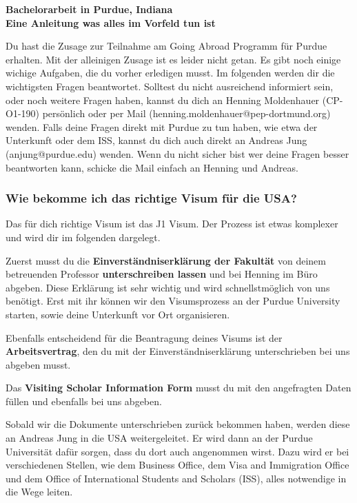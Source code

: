 \documentclass[
  paper=a4,
  fontsize=12pt,
  DIV=16,
  headheight=52pt,
  footheight=45pt,
  headinclude,
  parskip=full,
]{scrartcl}
\date{10. October 2017}
\begin{document}
\textbf{\Huge\sffamily Bachelorarbeit in Purdue, Indiana}\\[0.5\baselineskip]
\textbf{\Large\sffamily Eine Anleitung was alles im Vorfeld tun ist}

Du hast die Zusage zur Teilnahme am Going Abroad Programm für Purdue erhalten.
Mit der alleinigen Zusage ist es leider nicht getan.
Es gibt noch einige wichige Aufgaben, die du vorher erledigen musst.
Im folgenden werden dir die wichtigsten Fragen beantwortet.
Solltest du nicht ausreichend informiert sein, oder noch weitere Fragen haben,
kannst du dich an Henning Moldenhauer (CP-O1-190) persönlich oder per Mail
(henning.moldenhauer@pep-dortmund.org) wenden.
Falls deine Fragen direkt mit Purdue zu tun haben, wie etwa der Unterkunft oder
dem ISS, kannst du dich auch direkt an Andreas Jung (anjung@purdue.edu) wenden.
Wenn du nicht sicher bist wer deine Fragen besser beantworten kann, schicke die
Mail einfach an Henning und Andreas.

\subsubsection*{Wie bekomme ich das richtige Visum für die USA?}
Das für dich richtige Visum ist das J1 Visum.
Der Prozess ist etwas komplexer und wird dir im folgenden dargelegt.

Zuerst musst du die \textbf{Einverständniserklärung der Fakultät} von deinem
betreuenden Professor \textbf{unterschreiben lassen} und bei Henning im Büro
abgeben.
Diese Erklärung ist sehr wichtig und wird schnellstmöglich von uns benötigt.
Erst mit ihr können wir den Visumsprozess an der Purdue University starten, sowie
deine Unterkunft vor Ort organisieren.

Ebenfalls entscheidend für die Beantragung deines Visums ist der
\textbf{Arbeitsvertrag}, den du mit der Einverständniserklärung unterschrieben
bei uns abgeben musst.

Das \textbf{Visiting Scholar Information Form} musst du mit den angefragten Daten
füllen und ebenfalls bei uns abgeben.

Sobald wir die Dokumente unterschrieben zurück bekommen haben, werden diese an
Andreas Jung in die USA weitergeleitet.
Er wird dann an der Purdue Universität dafür sorgen, dass du dort auch angenommen
wirst. Dazu wird er bei verschiedenen Stellen, wie dem Business Office,
dem Visa and Immigration Office und dem Office of International Students and
Scholars (ISS), alles notwendige in die Wege leiten.
\end{document}
